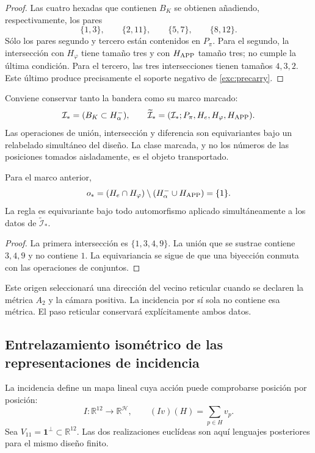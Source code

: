 \begin{proof}
Las cuatro hexadas que contienen $B_K$ se obtienen añadiendo,
respectivamente, los pares
\[
 \{1,3\},\qquad\{2,11\},\qquad\{5,7\},\qquad\{8,12\}.
\]
Sólo los pares segundo y tercero están contenidos en $P_\pi$. Para el
segundo, la intersección con $H_\varphi$ tiene tamaño tres y con
$H_{\rm APP}$ tamaño tres; no cumple la última condición. Para el
tercero, las tres intersecciones tienen tamaños $4,3,2$. Este último
produce precisamente el soporte negativo de \eqref{exc:precarry}.
\end{proof}

Conviene conservar tanto la bandera como su marco marcado:
\[
 \mathcal I_*=(B_K\subset H^-_\alpha),\qquad
 \widetilde{\mathcal I}_*
   =(\mathcal I_*;P_\pi,H_e,H_\varphi,H_{\rm APP}).
\]
Las operaciones de unión, intersección y diferencia son equivariantes
bajo un relabelado simultáneo del diseño. La clase marcada, y no los
números de las posiciones tomados aisladamente, es el objeto transportado.

\begin{lemma}
\label{exc:origen}
Para el marco anterior,
\[
 o_*=(H_e\cap H_\varphi)
           \setminus(H^-_\alpha\cup H_{\rm APP})=\{1\}.
\]
La regla es equivariante bajo todo automorfismo aplicado simultáneamente
a los datos de $\widetilde{\mathcal I}_*$.
\end{lemma}

\begin{proof}
La primera intersección es $\{1,3,4,9\}$. La unión que se sustrae
contiene $3,4,9$ y no contiene $1$. La equivariancia se sigue de que una
biyección conmuta con las operaciones de conjuntos.
\end{proof}

Este origen seleccionará una dirección del vecino reticular cuando se
declaren la métrica $A_2$ y la cámara positiva. La incidencia por sí sola
no contiene esa métrica. El paso reticular conservará explícitamente
ambos datos.



\subsection{Entrelazamiento isométrico de las representaciones de incidencia}
\label{exc:entrelazador}

La incidencia define un mapa lineal cuya acción puede comprobarse
posición por posición:
\begin{equation}
 I:\mathbb R^{12}\longrightarrow\mathbb R^{\mathcal H},
 \qquad (Iv)(H)=\sum_{p\in H}v_p.
 \label{exc:incidencia}
\end{equation}
Sea $V_{11}=\mathbf1^\perp\subset\mathbb R^{12}$. Las dos realizaciones
euclídeas son aquí lenguajes posteriores para el mismo diseño finito.

